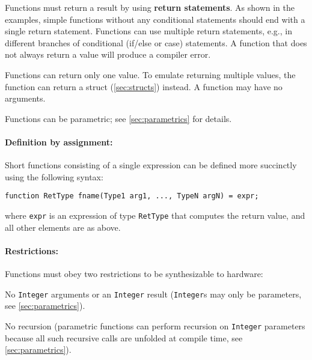 Functions must return a result by using \textbf{return statements}. %
As shown in the examples, simple functions without any conditional statements
should end with a single return statement.
Functions can use multiple return statements, e.g., in different branches
of conditional (if/else or case) statements.
A function that does not always return a value will produce a compiler error.

Functions can return only one value. To emulate returning multiple values, the
function can return a struct (\autoref{sec:structs}) instead.
%
A function may have no arguments.

Functions can be parametric; see \autoref{sec:parametrics} for details.

\paragraph{Definition by assignment:}
Short functions consisting of a single expression can be defined more succinctly using the following syntax:
\begin{center}
\verb|function RetType fname(Type1 arg1, ..., TypeN argN) = expr;|
\end{center}
where \verb|expr| is an expression of type \verb|RetType| that computes the return value,
and all other elements are as above.


\paragraph{Restrictions:}
Functions must obey two restrictions to be synthesizable to hardware:
\begin{compactenum}
\item No \texttt{Integer} arguments or an \texttt{Integer} result
  (\texttt{Integer}s may only be parameters, see \autoref{sec:parametrics}).
\item No recursion
  (parametric functions can perform recursion on \texttt{Integer} parameters
  because all such recursive calls are unfolded at compile time, see \autoref{sec:parametrics}).
\end{compactenum}

